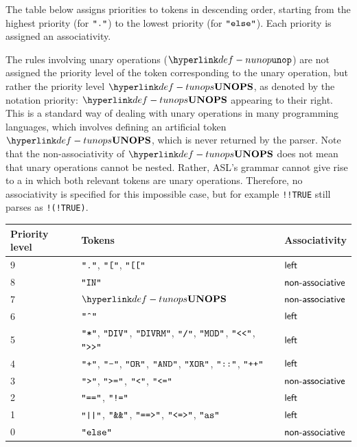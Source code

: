 The table below assigns priorities to tokens in descending order, starting from
the highest priority (for $\texttt{"}\texttt{.}\texttt{"}$) to the lowest priority (for $\texttt{"}\texttt{else}\texttt{"}$).
Each priority is assigned an associativity.

The rules involving unary operations ($\Nunop$) are not assigned the priority
level of the token corresponding to the unary operation, but rather the priority
level $\Tunops$, as denoted by the notation priority: $\Tunops$ appearing to
their right.
This is a standard way of dealing with unary operations in many programming
languages, which involves defining an artificial token $\Tunops$, which is
never returned by the parser. Note that the non-associativity of $\Tunops$
does not mean that unary operations cannot be nested. Rather, ASL's grammar cannot
give rise to a \shiftreduceconflictterm{} in which both relevant tokens are
unary operations.
Therefore, no associativity is specified for this impossible case, but for
example \texttt{!!TRUE} still parses as \texttt{!(!TRUE)}.

\begin{center}
\begin{tabular}{lll}
\textbf{Priority level} & \textbf{Tokens} & \textbf{Associativity}\\
\hline
9 & $\texttt{"}\texttt{.}\texttt{"}$, $\texttt{"}\texttt{[}\texttt{"}$, $\texttt{"}\texttt{[[}\texttt{"}$                                          & $\textsf{left}$\\
8 & $\texttt{"}\texttt{IN}\texttt{"}$                                                                        & $\textsf{non-associative}$\\
7 & $\Tunops$                                                                     & $\textsf{non-associative}$\\
6 & $\texttt{"}\texttt{\^{}}\texttt{"}$                                                                       & $\textsf{left}$\\
5 & $\texttt{"}\texttt{*}\texttt{"}$, $\texttt{"}\texttt{DIV}\texttt{"}$, $\texttt{"}\texttt{DIVRM}\texttt{"}$, $\texttt{"}\texttt{/}\texttt{"}$, $\texttt{"}\texttt{MOD}\texttt{"}$, $\texttt{"}\texttt{{<}{<}}\texttt{"}$, $\texttt{"}\texttt{{>}{>}}\texttt{"}$              & $\textsf{left}$\\
4 & $\texttt{"}\texttt{+}\texttt{"}$, $\texttt{"}\texttt{-}\texttt{"}$, $\texttt{"}\texttt{OR}\texttt{"}$, $\texttt{"}\texttt{AND}\texttt{"}$, $\texttt{"}\texttt{XOR}\texttt{"}$, $\texttt{"}\texttt{::}\texttt{"}$, $\texttt{"}\texttt{++}\texttt{"}$   & $\textsf{left}$\\
3 & $\texttt{"}\texttt{>}\texttt{"}$, $\texttt{"}\texttt{>=}\texttt{"}$, $\texttt{"}\texttt{<}\texttt{"}$, $\texttt{"}\texttt{<=}\texttt{"}$                                              & $\textsf{non-associative}$\\
2 & $\texttt{"}\texttt{==}\texttt{"}$, $\texttt{"}\texttt{!=}\texttt{"}$                                                             & $\textsf{left}$\\
1 & $\texttt{"}\texttt{||}\texttt{"}$, $\texttt{"}\texttt{\&\&}\texttt{"}$, $\texttt{"}\texttt{==>}\texttt{"}$, $\texttt{"}\texttt{<=>}\texttt{"}$, $\texttt{"}\texttt{as}\texttt{"}$                                 & $\textsf{left}$\\
0 & $\texttt{"}\texttt{else}\texttt{"}$                                                                      & $\textsf{non-associative}$
\end{tabular}
\end{center}


